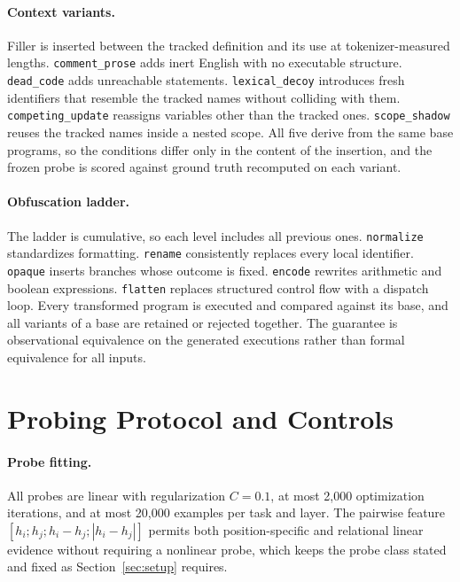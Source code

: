 \documentclass{article}
\begin{document}
\paragraph{Context variants.}
Filler is inserted between the tracked definition and its use at tokenizer-measured lengths. \texttt{comment\_prose} adds inert English with no executable structure. \texttt{dead\_code} adds unreachable statements. \texttt{lexical\_decoy} introduces fresh identifiers that resemble the tracked names without colliding with them. \texttt{competing\_update} reassigns variables other than the tracked ones. \texttt{scope\_shadow} reuses the tracked names inside a nested scope. All five derive from the same base programs, so the conditions differ only in the content of the insertion, and the frozen probe is scored against ground truth recomputed on each variant.

\paragraph{Obfuscation ladder.}
The ladder is cumulative, so each level includes all previous ones. \texttt{normalize} standardizes formatting. \texttt{rename} consistently replaces every local identifier. \texttt{opaque} inserts branches whose outcome is fixed. \texttt{encode} rewrites arithmetic and boolean expressions. \texttt{flatten} replaces structured control flow with a dispatch loop. Every transformed program is executed and compared against its base, and all variants of a base are retained or rejected together. The guarantee is observational equivalence on the generated executions rather than formal equivalence for all inputs.

\section{Probing Protocol and Controls}
\label{app:probes}

\paragraph{Probe fitting.}
All probes are linear with regularization $C=0.1$, at most 2{,}000 optimization iterations, and at most 20{,}000 examples per task and layer. The pairwise feature $[h_i;h_j;h_i-h_j;|h_i-h_j|]$ permits both position-specific and relational linear evidence without requiring a nonlinear probe, which keeps the probe class stated and fixed as Section~\ref{sec:setup} requires.
\end{document}

